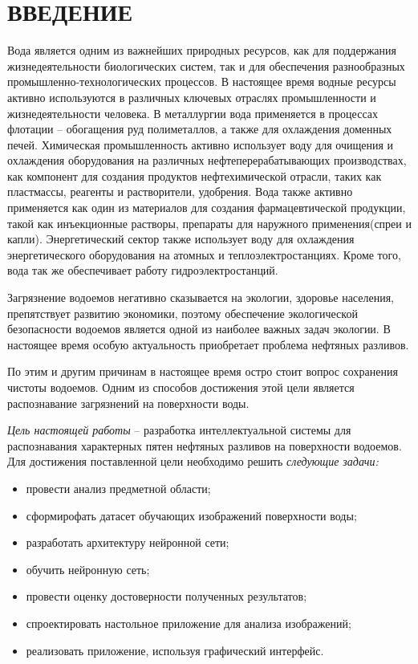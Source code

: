\section*{ВВЕДЕНИЕ}

Вода является одним из важнейших природных ресурсов, как для поддержания жизнедеятельности биологических систем, так и для обеспечения разнообразных промышленно-технологических процессов. В настоящее время водные ресурсы активно используются в различных ключевых отраслях промышленности и жизнедеятельности человека. В металлургии вода применяется в процессах флотации -- обогащения руд полиметаллов, а также для охлаждения доменных печей. Химическая промышленность активно использует воду  для очищения и охлаждения оборудования на различных нефтеперерабатывающих производствах, как компонент для создания продуктов нефтехимической отрасли, таких как пластмассы, реагенты и растворители, удобрения. Вода также активно применяется как один из материалов для создания фармацевтической продукции, такой как инъекционные растворы, препараты для наружного применения(спреи и капли).  Энергетический сектор также использует воду для охлаждения энергетического оборудования на атомных и теплоэлектростанциях. Кроме того, вода так же обеспечивает работу гидроэлектростанций. 

Загрязнение водоемов негативно сказывается на экологии, здоровье населения, препятствует развитию экономики, поэтому обеспечение экологической безопасности водоемов является одной из наиболее важных задач экологии. В настоящее время особую актуальность приобретает проблема нефтяных разливов.

По этим и другим причинам в настоящее время остро стоит вопрос сохранения чистоты водоемов. Одним из способов достижения этой цели является распознавание загрязнений на поверхности воды.

\emph{Цель настоящей работы} – разработка интеллектуальной системы для распознавания характерных пятен нефтяных разливов на поверхности водоемов. Для достижения поставленной цели необходимо решить \emph{следующие задачи:}
\begin{itemize}
\item провести анализ предметной области;
\item сформирофать датасет обучающих изображений поверхности воды;
\item разработать архитектуру нейронной сети;
\item обучить нейронную сеть;
\item провести оценку достоверности полученных результатов;
\item спроектировать настольное приложение для анализа изображений;
\item реализовать приложение, используя графический интерфейс.
\end{itemize}

